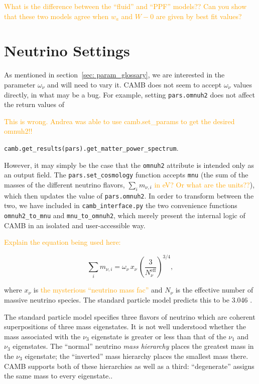 \textcolor{orange}{What is the difference between the ``fluid'' and ``PPF''
models?? Can you show that these two models agree when $w_a$ and $W-0$ are
given by best fit values?}

\section{Neutrino Settings}


As mentioned in section~\ref{sec: param_glossary}, we are interested in the
parameter $\omega_\nu$ and will need to vary it. CAMB does not seem to accept
$\omega_\nu$ values directly, in what may be a bug. For example, setting
\verb|pars.omnuh2| does not affect the return values of

\textcolor{orange}{This is wrong. Andrea was able to use camb.set\_params to 
get the desired omnuh2!!}

\verb|camb.get_results(pars).get_matter_power_spectrum|.

However, it may simply be the case that the \verb|omnuh2| attribute is
intended only as an output field. The \verb|pars.set_cosmology| function
accepts \verb|mnu| (the sum of the masses of the different neutrino flavors,
$\sum_i m_{\nu, i}$ \textcolor{orange}{in eV? Or what are the units??}),
which then updates the value of \verb|pars.omnuh2|.
In order to transform between the two, we have included in
\verb|camb_interface.py| the two convenience functions
\verb|omnuh2_to_mnu| and \verb|mnu_to_omnuh2|, which merely present the 
internal logic of CAMB in an isolated and user-accessible way.

\textcolor{orange}{Explain the equation being used here:}

\begin{equation}
\sum_i m_{\nu, i}
=
\omega_\nu \, x_\nu \, \left( \frac{3}{N_\nu^\text{eff}} \right)^{3/4}
,\end{equation}

where $x_\nu$ is \textcolor{orange}{the mysterious ``neutrino mass fac''} and
$N_\nu$ is the effective number of massive neutrino species. The standard
particle model predicts this to be 3.046 .

The standard particle model specifies three flavors of neutrino which are
coherent superpositions of three mass eigenstates. It is not well understood
whether the mass associated with the $\nu_3$ eigenstate is greater or less
than that of the $\nu_1$ and $\nu_3$ eigenstates. The ``normal'' neutrino
\textit{mass hierarchy} places the greatest mass in the $\nu_3$
eigenstate; the ``inverted'' mass hierarchy places the smallest mass there. 
CAMB supports both of these hierarchies as well as a third: ``degenerate''
assigns the same mass to every eigenstate..

